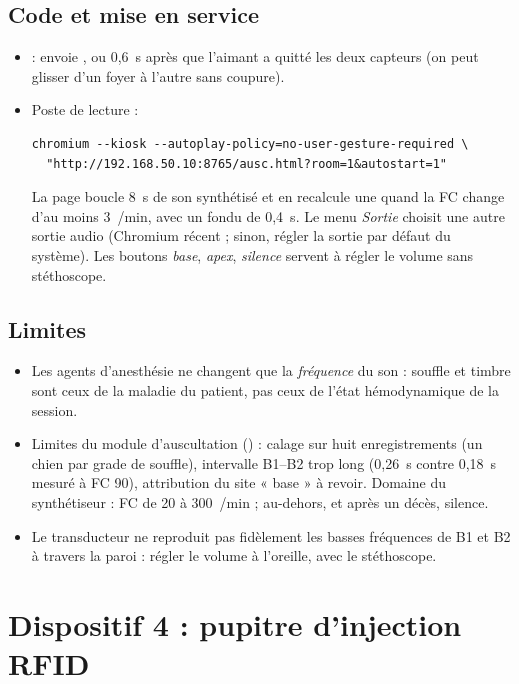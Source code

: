 \documentclass[11pt,a4paper]{article}
\begin{document}
\subsection{Code et mise en service}
\begin{itemize}
  \item {} : envoie , ou
   0,6~s après que l'aimant a quitté les deux capteurs (on peut glisser d'un foyer à l'autre sans coupure).
  \item Poste de lecture :
\begin{Verbatim}
chromium --kiosk --autoplay-policy=no-user-gesture-required \
  "http://192.168.50.10:8765/ausc.html?room=1&autostart=1"
\end{Verbatim}
  La page boucle 8~s de son synthétisé et en recalcule une quand la FC change d'au moins 3~/min, avec un fondu de
  0,4~s. Le menu \emph{Sortie} choisit une autre sortie audio (Chromium récent ; sinon, régler la sortie par défaut
  du système). Les boutons \emph{base}, \emph{apex}, \emph{silence} servent à régler le volume sans stéthoscope.
\end{itemize}

\subsection{Limites}
\begin{itemize}
  \item Les agents d'anesthésie ne changent que la \emph{fréquence} du son : souffle et timbre sont ceux de la maladie du
  patient, pas ceux de l'état hémodynamique de la session.
  \item Limites du module d'auscultation () : calage sur huit enregistrements (un chien par
  grade de souffle), intervalle B1--B2 trop long (0,26~s contre 0,18~s mesuré à FC 90), attribution du site « base »
  à revoir. Domaine du synthétiseur : FC de 20 à 300~/min ; au-dehors, et après un décès, silence.
  \item Le transducteur ne reproduit pas fidèlement les basses fréquences de B1 et B2 à travers la paroi : régler le
  volume à l'oreille, avec le stéthoscope.
\end{itemize}

\section{Dispositif 4 : pupitre d'injection RFID}
\end{document}
